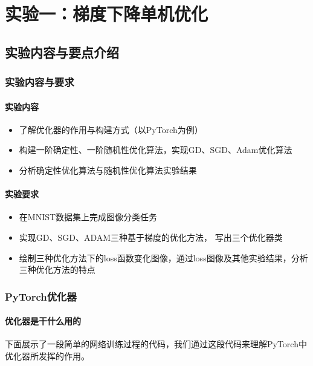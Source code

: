 \chapter{实验一：梯度下降单机优化}\label{chapter:task1}

\section{实验内容与要点介绍}

\subsection{实验内容与要求}

\subsubsection{实验内容}
\begin{itemize}
    \item 了解优化器的作用与构建方式（以PyTorch为例）
    \item 构建一阶确定性、一阶随机性优化算法，实现GD、SGD、Adam优化算法
    \item 分析确定性优化算法与随机性优化算法实验结果
\end{itemize}

\subsubsection{实验要求}
\begin{itemize}
    \item 在MNIST数据集上完成图像分类任务
    \item 实现GD、SGD、ADAM三种基于梯度的优化方法， 写出三个优化器类
    \item 绘制三种优化方法下的loss函数变化图像，通过loss图像及其他实验结果，分析三种优化方法的特点
\end{itemize}

\subsection{PyTorch优化器}

\subsubsection{优化器是干什么用的}

下面展示了一段简单的网络训练过程的代码，我们通过这段代码来理解PyTorch中优化器所发挥的作用。

